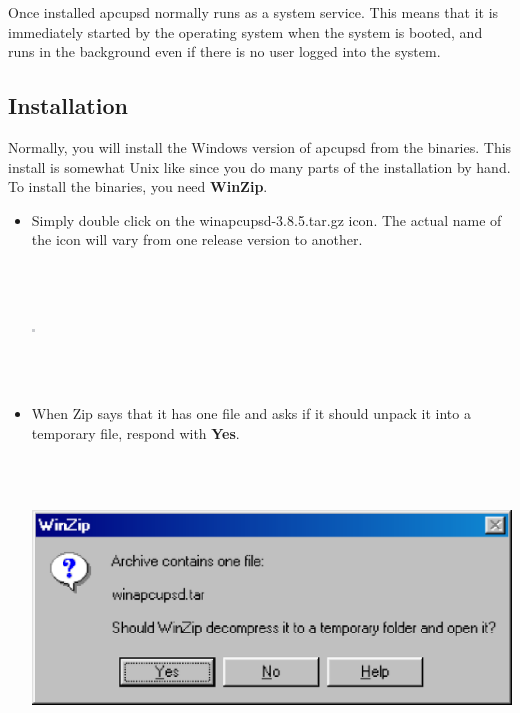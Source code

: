 {{{{{{{{{{Once installed apcupsd normally runs as a system service.  This means that it
is immediately started by the operating system when the system is booted, and
runs in the background even if there is no user logged into the system. 

\label{Installation}

\subsection*{Installation}

Normally, you will install the Windows version of apcupsd from the binaries.
This install is somewhat Unix like since you do many parts of the installation
by hand. To install the binaries, you need {\bf WinZip}.  

\begin{itemize}
\item Simply double click on the winapcupsd-3.8.5.tar.gz icon.  The actual
   name of the icon will vary from one release version to another.  

\footnotesize
\begin{verbatim}
     
     
\end{verbatim}
\normalsize

\includegraphics{./wininstall3.eps}  

\footnotesize
\begin{verbatim}
     
     
\end{verbatim}
\normalsize

\item When Zip says that it has one file and asks if it should unpack it into
   a temporary file, respond with {\bf Yes}.  

\footnotesize
\begin{verbatim}
     
     
\end{verbatim}
\normalsize

\includegraphics{./wininstall4.eps}  


\end{itemize}}}}}}}}}}}
